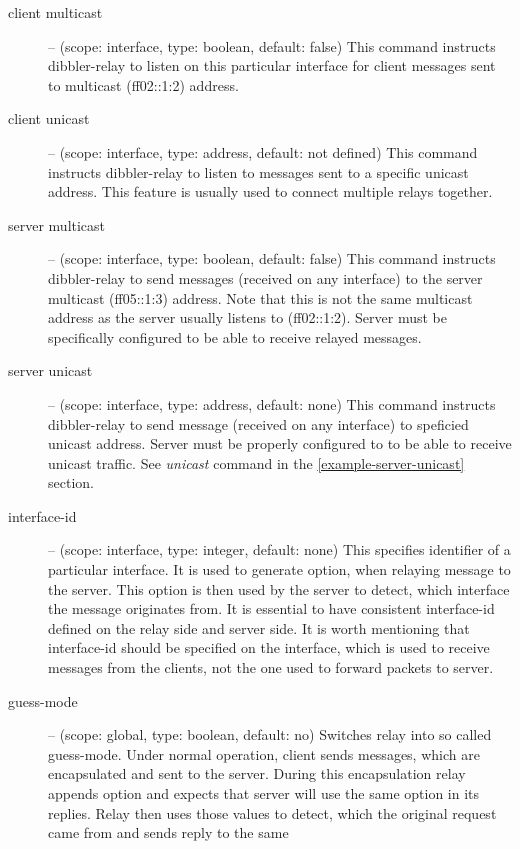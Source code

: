 \begin{description}
\item[client multicast] -- (scope: interface, type: boolean, default: false)
        This command instructs dibbler-relay to listen on this particular interface
        for client messages sent to multicast (ff02::1:2) address.
\item[client unicast] -- (scope: interface, type: address, default: not defined)
        This command instructs dibbler-relay to listen to messages sent to a specific
        unicast address. This feature is usually used to connect multiple relays
        together.
\item[server multicast] -- (scope: interface, type: boolean, default: false)
        This command instructs dibbler-relay to send messages (received on any interface)
        to the server multicast (ff05::1:3) address. Note that this is not the same
        multicast address as the server usually listens to (ff02::1:2). Server must be
        specifically configured to be able to receive relayed messages.
\item[server unicast] -- (scope: interface, type: address, default: none)
        This command instructs dibbler-relay to send message (received on any interface)
        to speficied unicast address. Server must be properly configured to to be able to
        receive unicast traffic. See \emph{unicast} command in the \ref{example-server-unicast}
        section.
\item[interface-id] -- (scope: interface, type: integer, default: none)
        This specifies identifier of a particular interface. It is used to generate
         option, when relaying message to the server. This option
        is then used by the server to detect, which interface the message originates from.
        It is essential to have consistent interface-id defined on the relay side and
        server side. It is worth mentioning that interface-id should be specified on the
        interface, which is used to receive messages from the clients, not the
        one used to forward packets to server.
\item[guess-mode] -- (scope: global, type: boolean, default: no)
        Switches relay into so called guess-mode. Under normal operation, client sends
        messages, which are encapsulated and sent to the server. During this encapsulation
        relay appends  option and expects that server will use the same
         option in its replies. Relay then uses those 
        values to detect, which the original request came from and sends reply to the same

\end{description}
